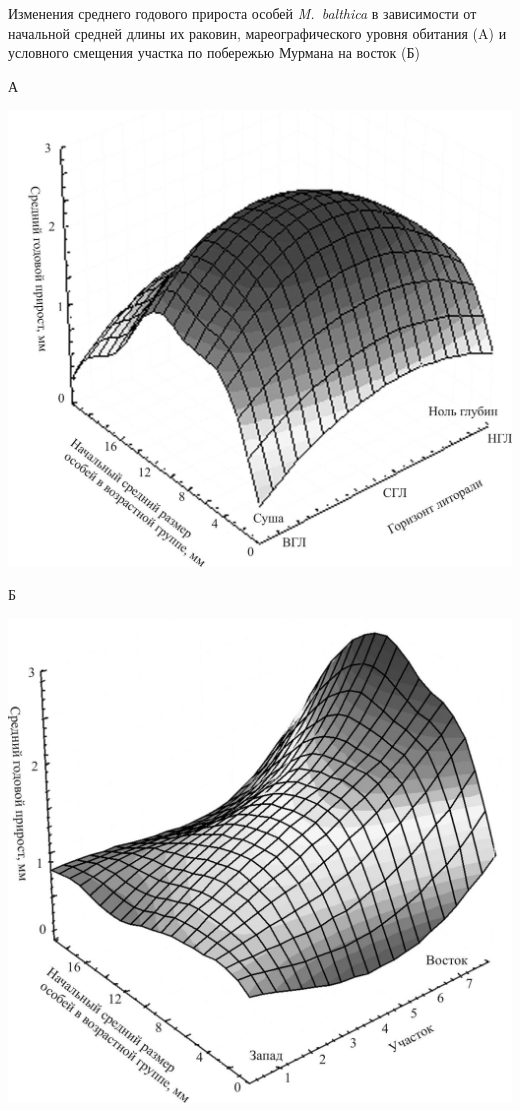 \documentclass{beamer}
\begin{document}
\begin{frame}{\small Изменения среднего годового прироста особей {\it M.~balthica} в зависимости от начальной средней длины их раковин, мареографического уровня обитания (A) и условного смещения участка по побережью Мурмана на восток (Б)}
	\begin{minipage}[t]{.49\linewidth}
				{\small А}
			\begin{center}
				\includegraphics[width=\textwidth]{./prirost_otklik_mareography.jpg}
			\end{center}
		\end{minipage}
	\hfil %
		\begin{minipage}[t]{.49\linewidth}
				{\small Б}
			\begin{center}
				\includegraphics[width=\textwidth]{./prirost_otklik_geography.jpg}

\end{center}
\end{minipage}
\end{frame}
\end{document}
